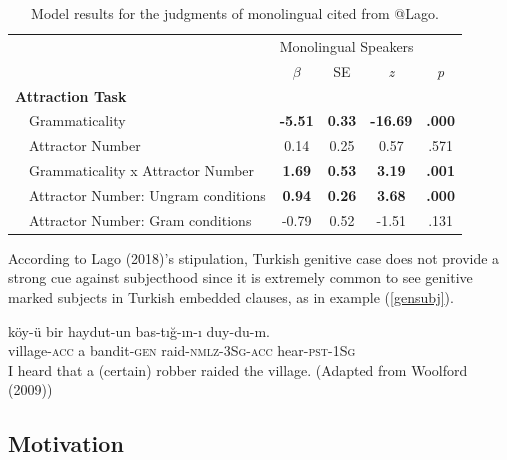 \documentclass[11pt,a4paper]{article}
\begin{document}
\begin{table}[]
\centering
\begin{tabular}{llcccc}
\hline
    &                                        & \multicolumn{4}{l}{Monolingual Speakers}                                               \\ \cline{3-6} 
    &                                        & $\beta$        & SE            & \emph{z} & \emph{p} \\ \hline
\multicolumn{2}{l}{\textbf{Attraction Task}} &                &               &                           &                           \\
    & Grammaticality                         & \textbf{-5.51} & \textbf{0.33} & \textbf{-16.69}           & \textbf{.000}             \\
    & Attractor Number                       & 0.14           & 0.25          & 0.57                      & .571                      \\
    & Grammaticality x Attractor Number      & \textbf{1.69}  & \textbf{0.53} & \textbf{3.19}             & \textbf{.001}             \\
    & Attractor Number: Ungram conditions    & \textbf{0.94}  & \textbf{0.26} & \textbf{3.68}             & \textbf{.000}             \\
    & Attractor Number: Gram conditions      & -0.79          & 0.52          & -1.51                     & .131                      \\ \hline
\end{tabular}
\caption{Model results for the judgments of monolingual cited from @Lago.}
\label{lagomodel}
\end{table}

According to Lago (2018)'s stipulation, Turkish genitive case does not
provide a strong cue against subjecthood since it is extremely common to
see genitive marked subjects in Turkish embedded clauses, as in example
(\ref{gensubj}).

\begin{exe}
\ex \label{gensubj}
\gll k\"{o}y-\"{u} bir haydut-un bas-t{\i}\u{g}-{\i}n-{\i} duy-du-m.\\
village-\textsc{acc} a bandit-\textsc{gen} raid-\textsc{nmlz}-\textsc{3Sg}-\textsc{acc} hear-\textsc{pst}-\textsc{1Sg}\\
\glt I heard that a (certain) robber raided the village. (Adapted from Woolford (2009))
\end{exe}

\hypertarget{motivation}{%
\subsection{Motivation}\label{motivation}}
\end{document}

